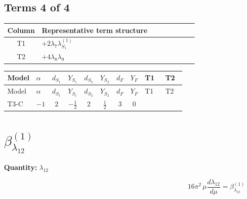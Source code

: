 \documentclass[8pt]{article}
\begin{document}
\begin{landscape}
\subsection*{Terms 4 of 4}
\begin{center}
\begin{tabular}{@{}c >{\raggedright\arraybackslash}p{0.82\linewidth}@{}}
\toprule
Column & Representative term structure \\
\midrule
T1 & \(\displaystyle +2 {\lambda_{7}} {\lambda_{S_1}^{(1)}}\) \\
\midrule
T2 & \(\displaystyle +4 {\lambda_{8}} {\lambda_{9}}\) \\
\midrule
\bottomrule
\end{tabular}
\end{center}
\smallskip
\tiny
\begin{longtable}{@{}llcccccc >{\raggedright\arraybackslash}p{0.21\linewidth} >{\raggedright\arraybackslash}p{0.21\linewidth}@{}}
\toprule
Model & $\alpha$ & $d_{S_1}$ & $Y_{S_1}$ & $d_{S_2}$ & $Y_{S_2}$ & $d_F$ & $Y_F$ & T1 & T2 \\
\midrule
\endfirsthead
\toprule
Model & $\alpha$ & $d_{S_1}$ & $Y_{S_1}$ & $d_{S_2}$ & $Y_{S_2}$ & $d_F$ & $Y_F$ & T1 & T2 \\
\midrule
\endhead
T3-C & $-1$ & $2$ & $-\frac{1}{2}$ & $2$ & $\frac{1}{2}$ & $3$ & $0$ & \scriptsize\adjustbox{max width=\linewidth}{$\begin{gathered} +2 {\lambda_{7}} {\lambda_{S_1}^{(1)}}\end{gathered}$} & \scriptsize\adjustbox{max width=\linewidth}{$\begin{gathered} +4 {\lambda_{8}} {\lambda_{9}}\end{gathered}$} \\
\midrule
\bottomrule
\end{longtable}
\clearpage
\section*{$\beta_{\lambda_{12}}^{(1)}$}
\noindent\textbf{Quantity: }$\lambda_{12}$\par\smallskip
\[16\pi^2\,\mu\frac{d \lambda_{12}}{d\mu}=\beta_{\lambda_{12}}^{(1)}\]

\end{landscape}
\end{document}
